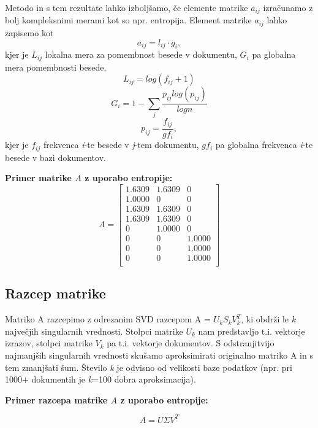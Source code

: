\documentclass{article}
\begin{document}
\par Metodo in s tem rezultate lahko izboljšamo, če elemente matrike $a_{ij}$ izračunamo z bolj kompleksnimi merami kot so npr. entropija. Element matrike $a_{ij}$ lahko zapisemo kot
\[ a_{ij} = l_{ij} \cdot g_i,\]
kjer je $L_{ij}$ lokalna mera za pomembnost besede v dokumentu, $G_i$ pa globalna mera pomembnosti besede.
\[ L_{ij} = log(f_{ij} + 1)\]
\[ G_i = 1 - \sum_{j} \frac{p_{ij} log(p_{ij})}{logn} \]
\[ p_{ij} = \frac{f_{ij}}{gf_i},\]
kjer je $f_{ij}$ frekvenca \textit{i}-te besede v \textit{j}-tem dokumentu, $gf_i$ pa globalna frekvenca \textit{i}-te besede v bazi dokumentov. 
\par \textbf{Primer matrike $A$ z uporabo entropije:}
\[
A = \begin{bmatrix}
    1.6309  & 1.6309 &  0 \\
    1.0000  & 0      &  0 \\
    1.6309  & 1.6309 &  0 \\
    1.6309  & 1.6309 &  0 \\
    0       & 1.0000 &  0 \\
    0       & 0      &  1.0000 \\
    0       & 0      &  1.0000 \\
    0       & 0      &  1.0000 \\
 \end{bmatrix}
\]

\subsection{Razcep matrike}
\par Matriko A razcepimo z odrezanim SVD razcepom A = $U_kS_kV_k^T$, ki obdrži le \textit{k} največjih singularnih vrednosti. Stolpci matrike $U_k$ nam predstavljo t.i. vektorje izrazov, stolpci matrike $V_k$ pa t.i. vektorje dokumentov. S odstranjitvijo najmanjših singularnih vrednosti skušamo aproksimirati originalno matriko A in s tem zmanjšati šum. Število \textit{k} je odvisno od velikosti baze podatkov (npr. pri 1000+ dokumentih je \textit{k}=100 dobra aproksimacija).
\par \textbf{Primer razcepa matrike $A$ z uporabo entropije:}

\[
A = U \Sigma V^T
\]
\end{document}
